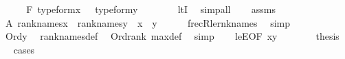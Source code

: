 \begin{isabellebody}
%
\isadelimproof
%
\endisadelimproof
%
\isatagproof
{}\isamarkupfalse%
\ {\isacharminus}{\kern0pt}\isanewline
\ \ \isamarkupfalse%
\ F{\isacharcolon}{\kern0pt}\ {\isachardoublequoteopen}type{\isacharunderscore}{\kern0pt}form{\isacharparenleft}{\kern0pt}x{\isacharparenright}{\kern0pt}\ {\isacharless}{\kern0pt}\ {}{\isachardoublequoteclose}\ {\isachardoublequoteopen}type{\isacharunderscore}{\kern0pt}form{\isacharparenleft}{\kern0pt}y{\isacharparenright}{\kern0pt}\ {\isacharless}{\kern0pt}\ {}{\isachardoublequoteclose}\isanewline
\ \ \ \ \isamarkupfalse%
\ ltI\ \isamarkupfalse%
\ simp{\isacharunderscore}{\kern0pt}all\isanewline
\ \ \isamarkupfalse%
\ assms\ \isanewline
\ \ \isamarkupfalse%
\ A{\isacharcolon}{\kern0pt}\ {\isachardoublequoteopen}rank{\isacharunderscore}{\kern0pt}names{\isacharparenleft}{\kern0pt}x{\isacharparenright}{\kern0pt}\ {\isasymle}\ rank{\isacharunderscore}{\kern0pt}names{\isacharparenleft}{\kern0pt}y{\isacharparenright}{\kern0pt}{\isachardoublequoteclose}\ {\isacharparenleft}{\kern0pt}\ {\isachardoublequoteopen}{\isacharquery}{\kern0pt}x\ {\isasymle}\ {\isacharquery}{\kern0pt}y{\isachardoublequoteclose}{\isacharparenright}{\kern0pt}\isanewline
\ \ \ \ \isamarkupfalse%
\ frecR{\isacharunderscore}{\kern0pt}le{\isacharunderscore}{\kern0pt}rnk{\isacharunderscore}{\kern0pt}names\ \isamarkupfalse%
\ simp\isanewline
\ \ \isamarkupfalse%
\isanewline
\ \ \isamarkupfalse%
\ {\isachardoublequoteopen}Ord{\isacharparenleft}{\kern0pt}{\isacharquery}{\kern0pt}y{\isacharparenright}{\kern0pt}{\isachardoublequoteclose}\ \isamarkupfalse%
\ rank{\isacharunderscore}{\kern0pt}names{\isacharunderscore}{\kern0pt}def\ \isamarkupfalse%
\ Ord{\isacharunderscore}{\kern0pt}rank\ max{\isacharunderscore}{\kern0pt}def\ \isamarkupfalse%
\ simp\isanewline
\ \ \isamarkupfalse%
\ leE{\isacharbrackleft}{\kern0pt}OF\ {\isacartoucheopen}{\isacharquery}{\kern0pt}x{\isasymle}{\isacharquery}{\kern0pt}y{\isacartoucheclose}{\isacharbrackright}{\kern0pt}\ \isanewline
\ \ \isamarkupfalse%
\isanewline
\ \ \isamarkupfalse%
\ {\isacharquery}{\kern0pt}thesis\isanewline
\ \ \isamarkupfalse%
{\isacharparenleft}{\kern0pt}cases{\isacharparenright}{\kern0pt}\isanewline
\ \ \ \ \isamarkupfalse%
\ {}\isanewline
\ \ \ \ \isamarkupfalse%

\end{isabellebody}
